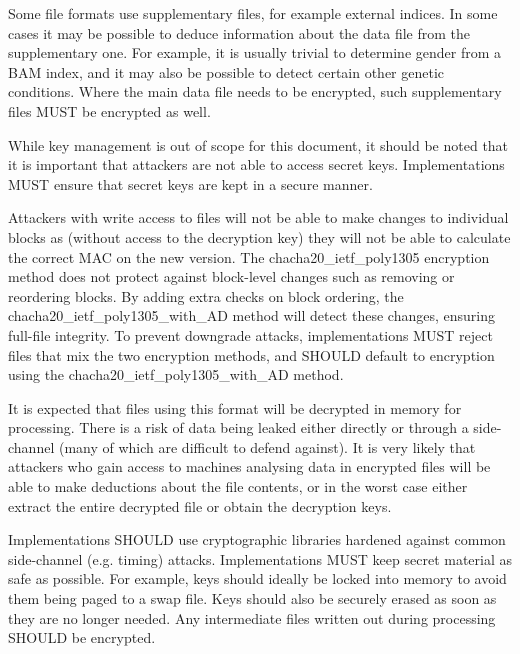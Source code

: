 \documentclass[10pt]{article}
\begin{document}
Some file formats use supplementary files, for example external indices.
In some cases it may be possible to deduce information about the data file from the supplementary one.
For example, it is usually trivial to determine gender from a BAM index,
and it may also be possible to detect certain other genetic conditions.
Where the main data file needs to be encrypted, such supplementary files MUST be encrypted as well.

While key management is out of scope for this document,
it should be noted that it is important that attackers are not able to access secret keys.
Implementations MUST ensure that secret keys are kept in a secure manner.

Attackers with write access to files will not be able to make changes to individual blocks as
(without access to the decryption key) they will not be able to calculate the correct MAC on the new version.
The chacha20\_ietf\_poly1305 encryption method does not protect against
block-level changes such as removing or reordering blocks.
By adding extra checks on block ordering,
the chacha20\_ietf\_poly1305\_with\_AD method will detect these changes,
ensuring full-file integrity.
To prevent downgrade attacks,
implementations MUST reject files that mix the two encryption methods,
and SHOULD default to encryption using the chacha20\_ietf\_poly1305\_with\_AD method.

It is expected that files using this format will be decrypted in memory for processing.
There is a risk of data being leaked either directly or through a side-channel (many of which are difficult to defend
against).
It is very likely that attackers who gain access to machines analysing data in encrypted files will be able
to make deductions about the file contents, or in the worst case either extract the entire decrypted file or
obtain the decryption keys.

Implementations SHOULD use cryptographic libraries hardened against common side-channel (e.g. timing) attacks.
Implementations MUST keep secret material as safe as possible.
For example, keys should ideally be locked into memory to avoid them being paged to a swap file.
Keys should also be securely erased as soon as they are no longer needed.
Any intermediate files written out during processing SHOULD be encrypted.
\end{document}
